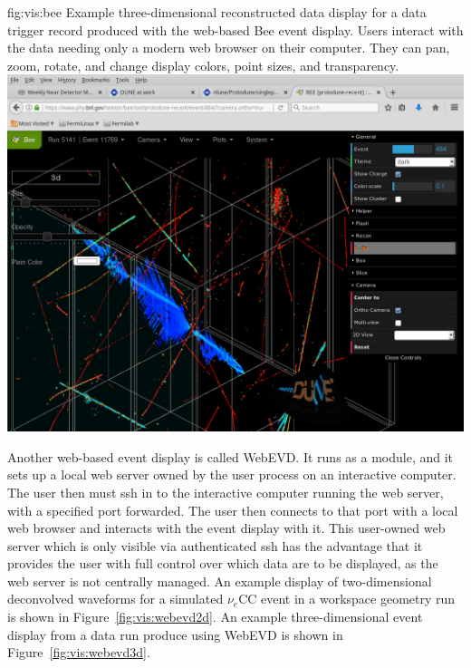 \documentclass[../main-v1.tex]{subfiles}
\begin{document}
\begin{dunefigure}
{fig:vis:bee} 
{Example three-dimensional reconstructed data display for a  data trigger record produced with the web-based Bee event display.  Users interact with the data needing only a modern web browser on their computer.  They can pan, zoom, rotate, and change display colors, point sizes, and transparency.}
\includegraphics[width=0.9 \textwidth]{graphics/EventDisplays/bee_pdsp_evd1.png}
\end{dunefigure}


Another web-based event display is called WebEVD.  It runs as a  module, and it sets up a local web server owned by the user process on an interactive computer.  The user then must ssh in to the interactive computer running the web server, with a specified port forwarded.  The user then connects to that port with a local web browser and interacts with the event display with it.  This user-owned web server which is only visible via authenticated ssh has the advantage that it provides the user with full control over which data are to be displayed, as the web server is not centrally managed.  An example display of two-dimensional deconvolved waveforms for a simulated $\nu_e$CC event in a  workspace geometry run is shown in Figure~\ref{fig:vis:webevd2d}.  An example three-dimensional event display from a  data run produce using WebEVD is shown in Figure~\ref{fig:vis:webevd3d}.
\end{document}
